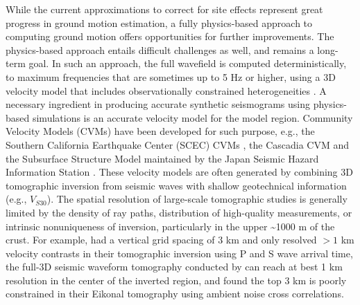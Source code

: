While the current approximations to correct for site effects represent great progress in ground motion estimation, a fully physics-based approach to computing ground motion offers opportunities for further improvements. The physics-based approach entails difficult challenges as well, and remains a long-term goal. In such an approach, the full wavefield is computed deterministically, to maximum frequencies that are sometimes up to 5 Hz or higher, using a 3D velocity model that includes observationally constrained heterogeneities \citep{savranGroundMotionSimulation2019,withersGroundMotionIntraevent2019,hu05HzDeterministic2021}. A necessary ingredient in producing accurate synthetic seismograms using physics-based simulations is an accurate velocity model for the model region. Community Velocity Models (CVMs) have been developed for such purpose, e.g., the Southern California Earthquake Center (SCEC) CVMs \citep{smallSCECUnifiedCommunity2017}, the Cascadia CVM \citep{stephensonCascadiaSubductionZone2017} and the Subsurface Structure Model maintained by the Japan Seismic Hazard Information Station \citep{fujiwaraJSHISINTEGRATEDSYSTEM2017}. These velocity models are often generated by combining 3D tomographic inversion from seismic waves \citep{tapeAdjointTomographySouthern2009,tapeSeismicTomographySouthern2010,leeFull3DTomographyCrustal2014} with shallow geotechnical information (e.g., $V_{S30}$). The spatial resolution of large-scale tomographic studies is generally limited by the density of ray paths, distribution of high-quality measurements, or intrinsic nonuniqueness of inversion, particularly in the upper \textasciitilde 1000 m of the crust. For example, \citet{linThreedimensionalCrustalSeismic2007} had a vertical grid spacing of 3 km and only resolved $> 1$ km velocity contrasts in their tomographic inversion using P and S wave arrival time, the full-3D seismic waveform tomography conducted by \citet{leeFull3DTomographyCrustal2014} can reach at best 1 km resolution in the center of the inverted region, and \citet{qiuEikonalTomographySouthern2019} found the top 3 km is poorly constrained in their Eikonal tomography using ambient noise cross correlations.


